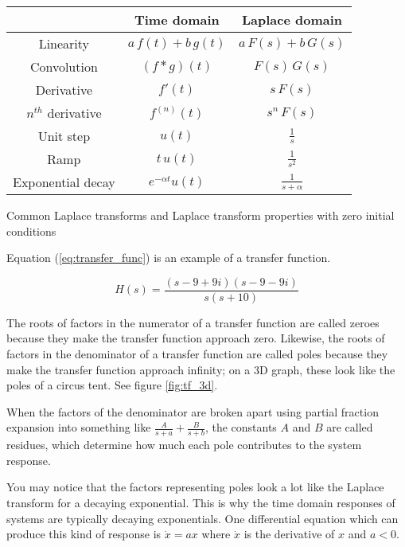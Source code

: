 \begin{booktable}
  \begin{tabular}{|ccc|}
    \hline
    \rowcolor{headingbg}
    & \textbf{Time domain} & \textbf{Laplace domain} \\
    \hline
    Linearity & $a\,f(t) + b\,g(t)$ & $a\,F(s) + b\,G(s)$ \\
    Convolution & $(f * g)(t)$ & $F(s) \,G(s)$ \\
    Derivative & $f'(t)$ & $s \,F(s)$ \\
    $n^{th}$ derivative & $f^{(n)}(t)$ & $s^n \,F(s)$ \\
    Unit step & $u(t)$ & $\frac{1}{s}$ \\
    Ramp & $t \,u(t)$ & $\frac{1}{s^2}$ \\
    Exponential decay & $e^{-\alpha t} u(t)$ & $\frac{1}{s + \alpha}$ \\
    \hline
  \end{tabular}
  \caption{Common Laplace transforms and Laplace transform properties with zero
    initial conditions}
  \label{tab:common-laplace-transforms}
\end{booktable}

Equation (\ref{eq:transfer_func}) is an example of a transfer function.

\begin{equation} \label{eq:transfer_func}
  H(s) = \frac{(s-9+9i)(s-9-9i)}{s(s+10)}
\end{equation}

The roots of factors in the numerator of a transfer function are called zeroes
because they make the transfer function approach zero. Likewise, the roots of
factors in the denominator of a transfer function are called poles because they
make the transfer function approach infinity; on a 3D graph, these look like the
poles of a circus tent. See figure \ref{fig:tf_3d}.

When the factors of the denominator are broken apart using partial fraction
expansion into something like $\frac{A}{s + a} + \frac{B}{s + b}$, the constants
$A$ and $B$ are called residues, which determine how much each pole contributes
to the system response.

You may notice that the factors representing poles look a lot like the Laplace
transform for a decaying exponential. This is why the time domain responses of
systems are typically decaying exponentials. One differential equation which can
produce this kind of response is $\dot{x} = ax$ where $\dot{x}$ is the
derivative of $x$ and $a < 0$.

